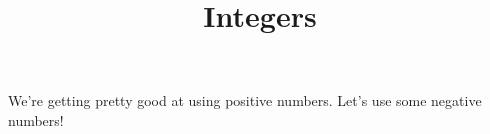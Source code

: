 \documentclass{ximera}
\title{Integers}
\begin{document}
\begin{abstract}
\end{abstract}
\maketitle

We're getting pretty good at using positive numbers.  Let's use some negative numbers!
\end{document}
